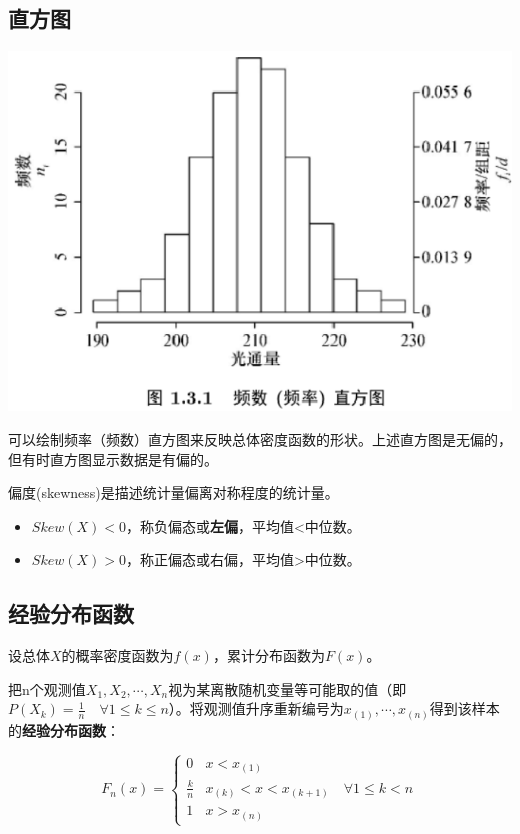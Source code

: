 \documentclass[UTF-8]{ctexbeamer}
\begin{document}
\subsection{直方图}

\begin{frame}
  \includegraphics[scale=0.5]{rate.png}

可以绘制频率（频数）直方图来反映总体密度函数的形状。上述直方图是无偏的，但有时直方图显示数据是有偏的。
\end{frame}

\begin{frame}
  \begin{Def}
    偏度(skewness)是描述统计量偏离对称程度的统计量。
    \begin{itemize}
    \item $Skew(X)<0$，称负偏态或\textbf{左偏}，平均值<中位数。
    \item $Skew(X)>0$，称正偏态或$\textbf{右偏}$，平均值>中位数。
    \end{itemize}
  \end{Def}
\end{frame}




\subsection{经验分布函数}
\begin{frame}
  设总体$X$的概率密度函数为$f(x)$，累计分布函数为$F(x)$。

把n个观测值$X_1,X_2,\cdots,X_n$视为某离散随机变量等可能取的值（即$P(X_k)=\frac{1}{n}\quad\forall 1\leq k\leq n$）。将观测值升序重新编号为$x_{(1)},\cdots,x_{(n)}$得到该样本的\textbf{经验分布函数}：

$$
F_n(x)=\begin{cases}
0& x<x_{(1)}\\ 
\frac{k}{n}& x_{(k)}<x<x_{(k+1)}\quad \forall 1\leq k<n\\
1&x>x_{(n)}
\end{cases}
$$
\end{frame}
\end{document}
